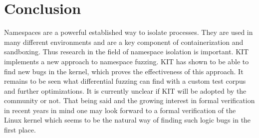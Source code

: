 \documentclass[10pt,twocolumn,a4paper]{article}
\begin{document}
\section{Conclusion}
Namespaces are a powerful established way to isolate processes. 
They are used in many different environments and are a key component of containerization and sandboxing.
Thus research in the field of namespace isolation is important.
KIT implements a new approach to namespace fuzzing.
KIT has shown to be able to find new bugs in the kernel, which proves the effectiveness of this approach. 
It remains to be seen what differential fuzzing can find with a custom test corpus and further optimizations.
It is currently unclear if KIT will be adopted by the community or not.
That being said and the growing interest in formal verification in recent years in mind one may look forward to a formal verification of the Linux kernel which seems to be the natural way of finding such logic bugs in the first place.


\end{document}

